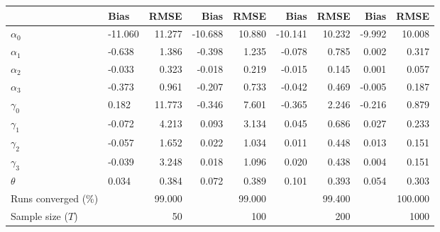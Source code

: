 
\begin{tabular}[t]{llrrrrrrr}
\toprule
  & Bias & RMSE & Bias & RMSE & Bias & RMSE & Bias & RMSE\\
\midrule
$\alpha_{0}$ & -11.060 & 11.277 & -10.688 & 10.880 & -10.141 & 10.232 & -9.992 & 10.008\\
$\alpha_{1}$ & -0.638 & 1.386 & -0.398 & 1.235 & -0.078 & 0.785 & 0.002 & 0.317\\
$\alpha_{2}$ & -0.033 & 0.323 & -0.018 & 0.219 & -0.015 & 0.145 & 0.001 & 0.057\\
$\alpha_{3}$ & -0.373 & 0.961 & -0.207 & 0.733 & -0.042 & 0.469 & -0.005 & 0.187\\
$\gamma_{0}$ & 0.182 & 11.773 & -0.346 & 7.601 & -0.365 & 2.246 & -0.216 & 0.879\\
$\gamma_{1}$ & -0.072 & 4.213 & 0.093 & 3.134 & 0.045 & 0.686 & 0.027 & 0.233\\
$\gamma_{2}$ & -0.057 & 1.652 & 0.022 & 1.034 & 0.011 & 0.448 & 0.013 & 0.151\\
$\gamma_{3}$ & -0.039 & 3.248 & 0.018 & 1.096 & 0.020 & 0.438 & 0.004 & 0.151\\
$\theta$ & 0.034 & 0.384 & 0.072 & 0.389 & 0.101 & 0.393 & 0.054 & 0.303\\
Runs converged (\%) &  & 99.000 &  & 99.000 &  & 99.400 &  & 100.000\\
Sample size ($T$) &  & 50 &  & 100 &  & 200 &  & 1000\\
\bottomrule
\end{tabular}
